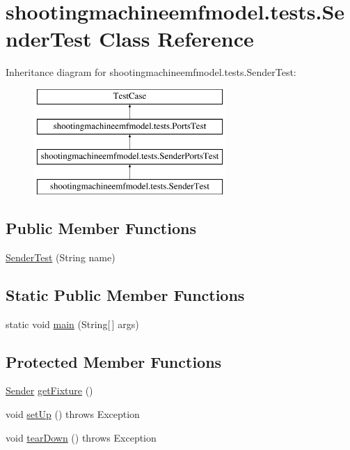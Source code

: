 \hypertarget{classshootingmachineemfmodel_1_1tests_1_1_sender_test}{\section{shootingmachineemfmodel.\-tests.\-Sender\-Test Class Reference}
\label{classshootingmachineemfmodel_1_1tests_1_1_sender_test}
}
Inheritance diagram for shootingmachineemfmodel.\-tests.\-Sender\-Test\-:\begin{figure}[H]
\begin{center}
\leavevmode
\includegraphics[height=4.000000cm]{classshootingmachineemfmodel_1_1tests_1_1_sender_test}
\end{center}
\end{figure}
\subsection*{Public Member Functions}
\begin{DoxyCompactItemize}
\item 
\hyperlink{classshootingmachineemfmodel_1_1tests_1_1_sender_test_ae13d8ae152479cd97703c61fa6961bc8}{Sender\-Test} (String name)
\end{DoxyCompactItemize}
\subsection*{Static Public Member Functions}
\begin{DoxyCompactItemize}
\item 
static void \hyperlink{classshootingmachineemfmodel_1_1tests_1_1_sender_test_ae12dddc1d009bcfb72c6f16835b7fed6}{main} (String\mbox{[}$\,$\mbox{]} args)
\end{DoxyCompactItemize}
\subsection*{Protected Member Functions}
\begin{DoxyCompactItemize}
\item 
\hyperlink{interfaceshootingmachineemfmodel_1_1_sender}{Sender} \hyperlink{classshootingmachineemfmodel_1_1tests_1_1_sender_test_a8b4ee3c89a008a4ea37f7ced5dd1179f}{get\-Fixture} ()
\item 
void \hyperlink{classshootingmachineemfmodel_1_1tests_1_1_sender_test_ac15fce433cef5bb57213e308684bd3ea}{set\-Up} ()  throws Exception 
\item 
void \hyperlink{classshootingmachineemfmodel_1_1tests_1_1_sender_test_a643b121aedcb0c128d44ba2ebec0e4a0}{tear\-Down} ()  throws Exception 
\end{DoxyCompactItemize}
